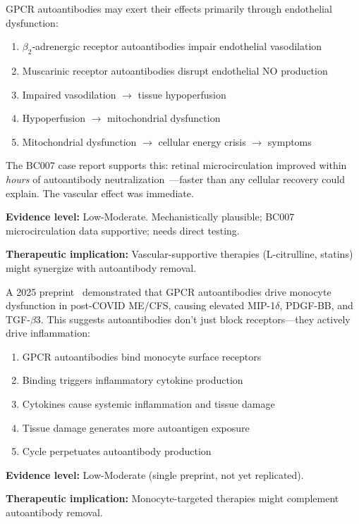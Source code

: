 \begin{hypothesis}
\label{hyp:gpcr-endothelial}
GPCR autoantibodies may exert their effects primarily through endothelial dysfunction:
\begin{enumerate}
    \item $\beta_2$-adrenergic receptor autoantibodies impair endothelial vasodilation
    \item Muscarinic receptor autoantibodies disrupt endothelial NO production
    \item Impaired vasodilation $\rightarrow$ tissue hypoperfusion
    \item Hypoperfusion $\rightarrow$ mitochondrial dysfunction
    \item Mitochondrial dysfunction $\rightarrow$ cellular energy crisis $\rightarrow$ symptoms
\end{enumerate}

The BC007 case report supports this: retinal microcirculation improved within \textit{hours} of autoantibody neutralization~\cite{Hohberger2021bc007}---faster than any cellular recovery could explain. The vascular effect was immediate.

\textbf{Evidence level:} Low-Moderate. Mechanistically plausible; BC007 microcirculation data supportive; needs direct testing.

\textbf{Therapeutic implication:} Vascular-supportive therapies (L-citrulline, statins) might synergize with autoantibody removal.
\end{hypothesis}

\begin{hypothesis}
\label{hyp:autoantibody-monocyte}
A 2025 preprint~\cite{Hackel2025monocyte} demonstrated that GPCR autoantibodies drive monocyte dysfunction in post-COVID ME/CFS, causing elevated MIP-1$\delta$, PDGF-BB, and TGF-$\beta$3. This suggests autoantibodies don't just block receptors---they actively drive inflammation:

\begin{enumerate}
    \item GPCR autoantibodies bind monocyte surface receptors
    \item Binding triggers inflammatory cytokine production
    \item Cytokines cause systemic inflammation and tissue damage
    \item Tissue damage generates more autoantigen exposure
    \item Cycle perpetuates autoantibody production
\end{enumerate}

\textbf{Evidence level:} Low-Moderate (single preprint, not yet replicated).

\textbf{Therapeutic implication:} Monocyte-targeted therapies might complement autoantibody removal.
\end{hypothesis}

